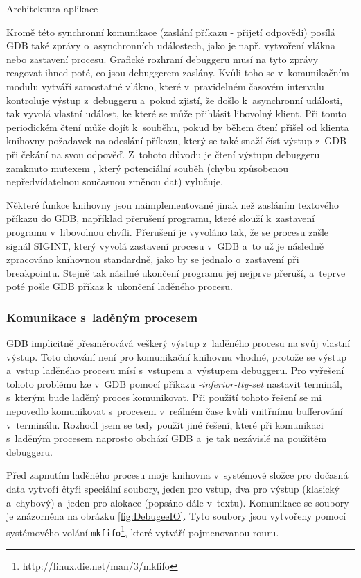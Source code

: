\documentclass[czech,bachelor,male,python,dept460,hidelinks]{diploma}						%
\newcommand{\parspace}[1][]{
	\ifthenelse{\isempty{#1}}{\vspace{0mm}}{\vspace{#1}}
	\par
}
\begin{document}
\begin{section}{Architektura aplikace}
			\parspace Kromě této synchronní komunikace (zaslání příkazu - přijetí odpovědi) posílá GDB také zprávy o~asynchronních událostech, jako je např.
			vytvoření vlákna nebo zastavení procesu. Grafické rozhraní debuggeru musí na tyto zprávy reagovat ihned poté, co jsou debuggerem zaslány.
			Kvůli toho se v~komunikačním modulu vytváří samostatné vlákno, které v~pravidelném časovém intervalu kontroluje výstup z~debuggeru a~pokud zjistí, že došlo
			k~asynchronní události, tak vyvolá vlastní událost, ke které se může přihlásit libovolný klient. Při tomto periodickém čtení může dojít k~souběhu, pokud
			by během čtení přišel od klienta knihovny požadavek na odeslání příkazu, který se také snaží číst výstup z~GDB při čekání na svou odpověď.
			Z~tohoto důvodu je čtení výstupu debuggeru zamknuto mutexem \cite[81]{tanenbaum}, který potenciální souběh (chybu způsobenou nepředvídatelnou
			současnou změnou dat) vylučuje.
			
			\parspace Některé funkce knihovny jsou naimplementované jinak než zasláním textového příkazu do GDB, například přerušení programu, které
			slouží k~zastavení programu v~libovolnou chvíli. Přerušení je vyvoláno tak, že se procesu zašle signál SIGINT, který vyvolá zastavení procesu v~GDB a~to
			už je následně zpracováno knihovnou standardně, jako by se jednalo o~zastavení při breakpointu. Stejně tak násilné ukončení programu jej nejprve přeruší,
			a~teprve poté pošle GDB příkaz k~ukončení laděného procesu.
			
		\subsubsection{Komunikace s~laděným procesem}
			GDB implicitně přesměrovává veškerý výstup z~laděného procesu na svůj vlastní výstup. Toto chování není pro komunikační knihovnu vhodné,
			protože se výstup a~vstup laděného procesu mísí s~vstupem a~výstupem debuggeru.
			Pro vyřešení tohoto problému lze v~GDB pomocí příkazu \textit{-inferior-tty-set} nastavit terminál, s~kterým bude laděný proces komunikovat.
			Při použití tohoto řešení se mi nepovedlo komunikovat s~procesem v~reálném čase kvůli vnitřnímu bufferování v~terminálu.
			Rozhodl jsem se tedy použít jiné řešení, které při komunikaci s~laděným procesem naprosto obchází GDB a~je tak nezávislé na použitém debuggeru.
			
			\parspace Před zapnutím laděného procesu moje knihovna v~systémové složce pro dočasná data vytvoří čtyři speciální soubory, jeden pro vstup, dva pro výstup
			(klasický a~chybový) a~jeden pro alokace (popsáno dále v~textu). Komunikace se soubory je znázorněna na obrázku \ref{fig:DebugeeIO}.
			Tyto soubory jsou vytvořeny pomocí systémového volání \texttt{mkfifo}\footnote{http://linux.die.net/man/3/mkfifo}, které vytváří pojmenovanou rouru.
			

\end{section}
\end{document}
